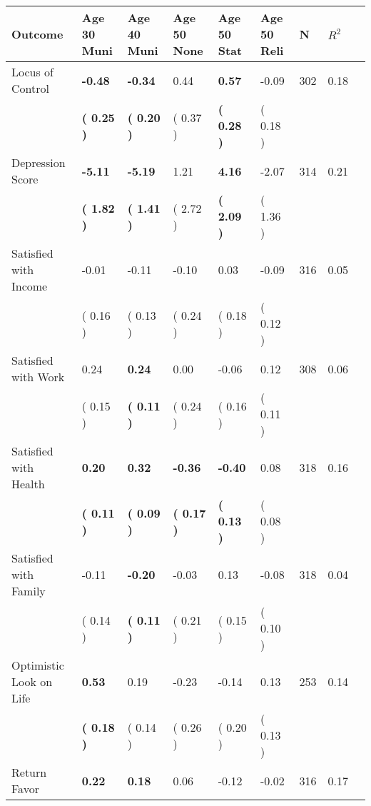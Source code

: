 \begin{tabular}{L{6.2cm} C{1.8cm} C{1.8cm} C{1.8cm} C{1.8cm} C{1.8cm} C{1.8cm} C{0.3cm} C{0.3cm}}
\toprule
 \textbf{Outcome} & \textbf{Age 30 Muni} & \textbf{Age 40 Muni} & \textbf{Age 50 None} & \textbf{Age 50 Stat} & \textbf{Age 50 Reli} & \textbf{N} & \textbf{$ R^2$} \\
\midrule
Locus of Control & \textbf{    -0.48} & \textbf{    -0.34} &      0.44 & \textbf{     0.57} &     -0.09  & 302 &       0.18 \\ 
 & \textbf{(     0.25 )} & \textbf{(     0.20 )} & (     0.37 ) & \textbf{(     0.28 )} & (     0.18 )  & \\
Depression Score & \textbf{    -5.11} & \textbf{    -5.19} &      1.21 & \textbf{     4.16} &     -2.07  & 314 &       0.21 \\ 
 & \textbf{(     1.82 )} & \textbf{(     1.41 )} & (     2.72 ) & \textbf{(     2.09 )} & (     1.36 )  & \\
Satisfied with Income &     -0.01 &     -0.11 &     -0.10 &      0.03 &     -0.09  & 316 &       0.05 \\ 
 & (     0.16 ) & (     0.13 ) & (     0.24 ) & (     0.18 ) & (     0.12 )  & \\
Satisfied with Work &      0.24 & \textbf{     0.24} &      0.00 &     -0.06 &      0.12  & 308 &       0.06 \\ 
 & (     0.15 ) & \textbf{(     0.11 )} & (     0.24 ) & (     0.16 ) & (     0.11 )  & \\
Satisfied with Health & \textbf{     0.20} & \textbf{     0.32} & \textbf{    -0.36} & \textbf{    -0.40} &      0.08  & 318 &       0.16 \\ 
 & \textbf{(     0.11 )} & \textbf{(     0.09 )} & \textbf{(     0.17 )} & \textbf{(     0.13 )} & (     0.08 )  & \\
Satisfied with Family &     -0.11 & \textbf{    -0.20} &     -0.03 &      0.13 &     -0.08  & 318 &       0.04 \\ 
 & (     0.14 ) & \textbf{(     0.11 )} & (     0.21 ) & (     0.15 ) & (     0.10 )  & \\
Optimistic Look on Life & \textbf{     0.53} &      0.19 &     -0.23 &     -0.14 &      0.13  & 253 &       0.14 \\ 
 & \textbf{(     0.18 )} & (     0.14 ) & (     0.26 ) & (     0.20 ) & (     0.13 )  & \\
Return Favor & \textbf{     0.22} & \textbf{     0.18} &      0.06 &     -0.12 &     -0.02  & 316 &       0.17 \\ 

\end{tabular}
